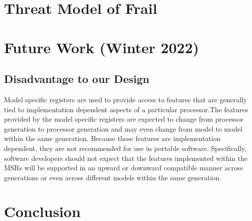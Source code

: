 \documentclass{report}
\begin{document}
\begin{spacing}{1.5}
\chapter{Threat Model of Frail}


\chapter{Future Work (Winter 2022)}


\section{Disadvantage to our Design}

Model specific registers are used to provide access to features that are generally tied to implementation dependent aspects of a particular processor.The features provided by the model specific registers are expected to change from processor
generation to processor generation and may even change from model to model within the same
generation. Because these features are implementation dependent, they are not recommended for
use in portable software. Specifically, software developers should not expect that the features
implemented within the MSRs will be supported in an upward or downward compatible manner
across generations or even across different models within the same generation.

\chapter{Conclusion}














\end{spacing}
\end{document}
